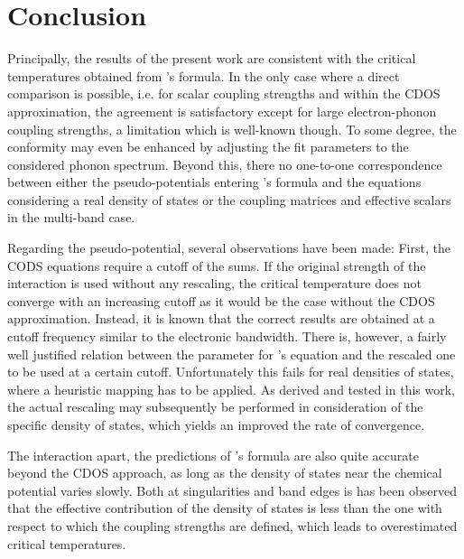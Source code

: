 
\chapter{Conclusion}
\label{conclusion}

Principally, the results of the present work are consistent with the critical
temperatures obtained from 's formula. In the only case where a
direct comparison is possible, i.e. for scalar coupling strengths and within the
CDOS approximation, the agreement is satisfactory except for large
electron-phonon coupling strengths, a limitation which is well-known though. To
some degree, the conformity may even be enhanced by adjusting the fit parameters
to the considered phonon spectrum. Beyond this, there no one-to-one
correspondence between either the  pseudo-potentials entering
's formula and the  equations considering a real
density of states or the coupling matrices and effective scalars in the
multi-band case.

Regarding the  pseudo-potential, several observations have been
made: First, the CODS  equations require a cutoff of the
 sums. If the original strength of the 
interaction is used without any rescaling, the critical temperature does not
converge with an increasing cutoff as it would be the case without the CDOS
approximation. Instead, it is known that the correct results are obtained at a
cutoff frequency similar to the electronic bandwidth. There is, however, a
fairly well justified relation between the parameter for 's
equation and the rescaled one to be used at a certain cutoff. Unfortunately this
fails for real densities of states, where a heuristic mapping has to be applied.
As derived and tested in this work, the actual rescaling may subsequently be
performed in consideration of the specific density of states, which yields an
improved the rate of convergence.

The  interaction apart, the predictions of 's
formula are also quite accurate beyond the CDOS approach, as long as the density
of states near the chemical potential varies slowly. Both at 
singularities and band edges is has been observed that the effective
contribution of the density of states is less than the one with respect to which
the coupling strengths are defined, which leads to overestimated critical
temperatures.


